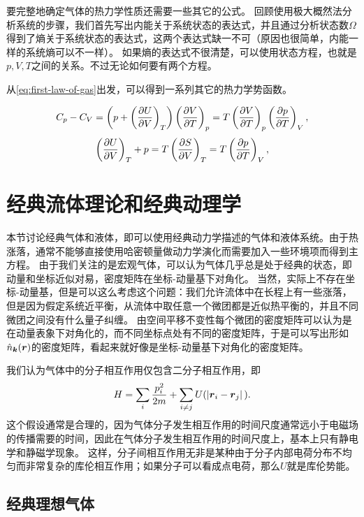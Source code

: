 \documentclass[hyperref, UTF8, a4paper]{ctexart}
\begin{document}
要完整地确定气体的热力学性质还需要一些其它的公式。
回顾使用极大概然法分析系统的步骤，我们首先写出内能关于系统状态的表达式，并且通过分析状态数$\Omega$得到了熵关于系统状态的表达式，这两个表达式缺一不可（原因也很简单，内能一样的系统熵可以不一样）。
如果熵的表达式不很清楚，可以使用状态方程，也就是$p, V, T$之间的关系。不过无论如何要有两个方程。

从\eqref{eq:first-law-of-gas}出发，可以得到一系列其它的热力学势函数。

\begin{equation}
    C_p - C_V = \left( p + \left(\pdv{U}{V}\right)_T \right) \left(\pdv{V}{T}\right)_p = T \left(\pdv{V}{T}\right)_p \left(\pdv{p}{T}\right)_V,
\end{equation}
\begin{equation}
    \left(\pdv{U}{V}\right)_T + p = T \left(\pdv{S}{V}\right)_T = T \left(\pdv{p}{T}\right)_V,
\end{equation}

\section{经典流体理论和经典动理学}

本节讨论经典气体和液体，即可以使用经典动力学描述的气体和液体系统。由于热涨落，通常不能够直接使用哈密顿量做动力学演化而需要加入一些环境项而得到主方程。
由于我们关注的是宏观气体，可以认为气体几乎总是处于经典的状态，即动量和坐标近似对易，密度矩阵在坐标-动量基下对角化。
当然，实际上不存在坐标-动量基，但是可以这么考虑这个问题：我们允许流体中在长程上有一些涨落，但是因为假定系统近平衡，从流体中取任意一个微团都是近似热平衡的，并且不同微团之间没有什么量子纠缠。
由空间平移不变性每个微团的密度矩阵可以认为是在动量表象下对角化的，而不同坐标点处有不同的密度矩阵，于是可以写出形如$\hat{n}_{\vb*{k}}(\vb*{r})$的密度矩阵，看起来就好像是坐标-动量基下对角化的密度矩阵。

我们认为气体中的分子相互作用仅包含二分子相互作用，即
\begin{equation}
    H = \sum_i \frac{p_i^2}{2m} + \sum_{i \neq j} U(\abs*{\vb*{r}_i - \vb*{r}_j}).
    \label{eq:general-gas-hamiltonian}
\end{equation}
这个假设通常是合理的，因为气体分子发生相互作用的时间尺度通常远小于电磁场的传播需要的时间，因此在气体分子发生相互作用的时间尺度上，基本上只有静电学和静磁学现象。
这样，分子间相互作用无非是某种由于分子内部电荷分布不均匀而非常复杂的库伦相互作用；如果分子可以看成点电荷，那么$U$就是库伦势能。

\subsection{经典理想气体}
\end{document}
